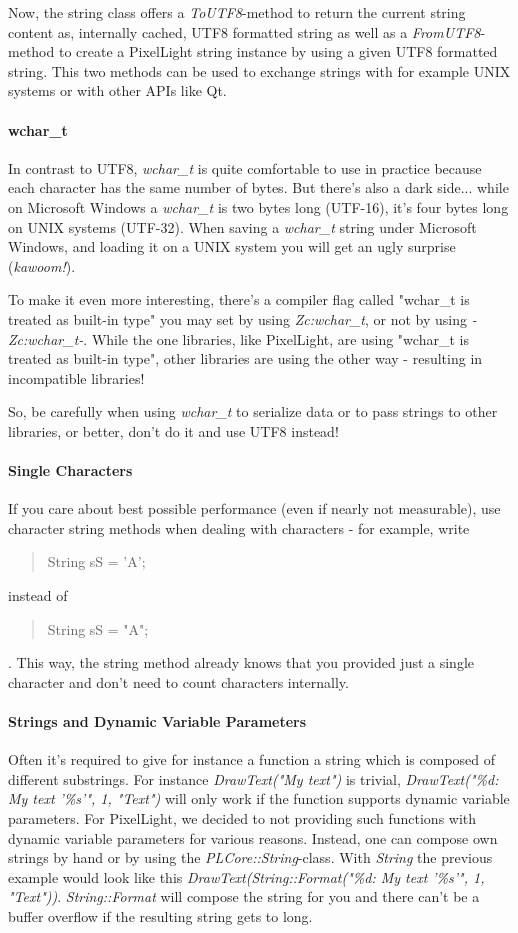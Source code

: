 Now, the string class offers a \emph{ToUTF8}-method to return the current string content as, internally cached, UTF8 formatted string as well as a \emph{FromUTF8}-method to create a PixelLight string instance by using a given UTF8 formatted string. This two methods can be used to exchange strings with for example UNIX systems or with other \ac{API}s like Qt.


\paragraph{wchar\_t}
In contrast to UTF8, \emph{wchar\_t} is quite comfortable to use in practice because each character has the same number of bytes. But there's also a dark side... while on Microsoft Windows a \emph{wchar\_t} is two bytes long (UTF-16), it's four bytes long on UNIX systems (UTF-32). When saving a \emph{wchar\_t} string under Microsoft Windows, and loading it on a UNIX system you will get an ugly surprise (\emph{kawoom!}).

To make it even more interesting, there's a compiler flag called "wchar\_t is treated as built-in type" you may set by using \emph{Zc:wchar\_t}, or not by using \emph{-Zc:wchar\_t-}. While the one libraries, like PixelLight, are using "wchar\_t is treated as built-in type", other libraries are using the other way - resulting in incompatible libraries!

So, be carefully when using \emph{wchar\_t} to serialize data or to pass strings to other libraries, or better, don't do it and use UTF8 instead!


\paragraph{Single Characters}
If you care about best possible performance (even if nearly not measurable), use character string methods when dealing with characters - for example, write \begin{quote}String sS = 'A';\end{quote} instead of \begin{quote}String sS = "A";\end{quote}. This way, the string method already knows that you provided just a single character and don't need to count characters internally.


\paragraph{Strings and Dynamic Variable Parameters}
Often it's required to give for instance a function a string which is composed of different substrings. For instance \emph{DrawText("My text")} is trivial, \emph{DrawText("\%d: My text '\%s'", 1, "Text")} will only work if the function supports dynamic variable parameters. For PixelLight, we decided to not providing such functions with dynamic variable parameters for various reasons. Instead, one can compose own strings by hand or by using the \emph{PLCore::String}-class. With \emph{String} the previous example would look like this \emph{DrawText(String::Format("\%d: My text '\%s'", 1, "Text"))}. \emph{String::Format} will compose the string for you and there can't be a buffer overflow if the resulting string gets to long.

